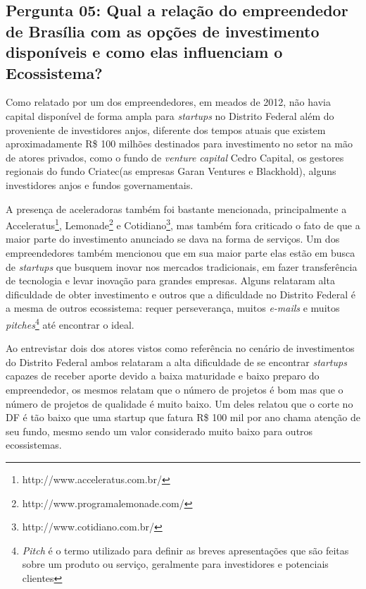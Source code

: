 \subsection*{Pergunta 05: Qual a relação do empreendedor de Brasília com as opções de investimento disponíveis e como elas influenciam o Ecossistema?}
\label{subsection:pergunta_de_pesquisa_5}

Como relatado por um dos empreendedores, em meados de 2012, não havia capital disponível de forma ampla para \textit{startups} no Distrito Federal além do proveniente de investidores anjos, diferente dos tempos atuais que existem aproximadamente R\$ 100 milhões destinados para investimento no setor na mão de atores privados, como o fundo de \textit{venture capital} Cedro Capital, os gestores regionais do fundo Criatec(as empresas Garan Ventures e Blackhold), alguns investidores anjos e fundos governamentais. 

A presença de aceleradoras também foi bastante mencionada, principalmente a Acceleratus\footnote{http://www.acceleratus.com.br/}, Lemonade\footnote{http://www.programalemonade.com/} e Cotidiano\footnote{http://www.cotidiano.com.br/}, mas também fora criticado o fato de que a maior parte do investimento anunciado se dava na forma de serviços. Um dos empreendedores também mencionou que em sua maior parte elas estão em busca de \textit{startups} que busquem inovar nos mercados tradicionais, em fazer transferência de tecnologia e levar inovação para grandes empresas. Alguns relataram alta dificuldade de obter investimento e outros que a dificuldade no Distrito Federal é a mesma de outros ecossistema: requer perseverança, muitos \textit{e-mails} e muitos \textit{pitches}\footnote{\textit{Pitch} é o termo utilizado para definir as breves apresentações que são feitas sobre um produto ou serviço, geralmente para investidores e potenciais clientes} até encontrar o ideal.

Ao entrevistar dois dos atores vistos como referência no cenário de investimentos do Distrito Federal ambos relataram a alta dificuldade de se encontrar \textit{startups} capazes de receber aporte devido a baixa maturidade e baixo preparo do empreendedor, os mesmos relatam que o número de projetos é bom mas que o número de projetos de qualidade é muito baixo. Um deles relatou que o corte no DF é tão baixo que uma startup que fatura R\$ 100 mil por ano chama atenção de seu fundo, mesmo sendo um valor considerado muito baixo para outros ecossistemas. 

